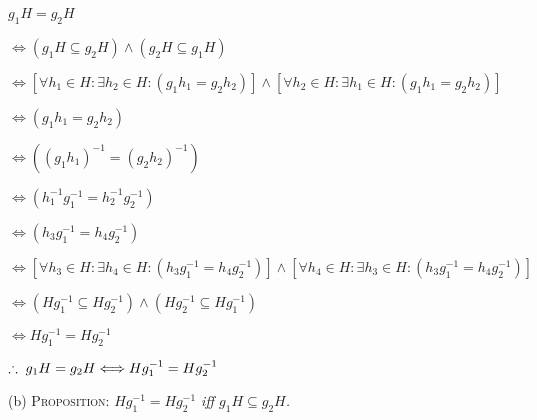 \documentclass[12pt, a4paper]{article}
\begin{document}
$g_1H=g_2H$\par
\vspace{5mm}
\hspace{8.2mm}$\Leftrightarrow(g_1H\subseteq g_2H)\wedge(g_2H\subseteq g_1H)$\par
\vspace{5mm}
\hspace{8.2mm}$\Leftrightarrow[\forall h_1\in H\colon\exists h_2\in H\colon (g_1h_1=g_2h_2)]\wedge [\forall h_2\in H\colon\exists h_1\in H\colon (g_1h_1=g_2h_2)]$\par
\vspace{5mm}
\hspace{8.2mm}$\Leftrightarrow (g_1h_1=g_2h_2)$\par
\vspace{5mm}
\hspace{8.2mm}$\Leftrightarrow ((g_1h_1)^{-1}=(g_2h_2)^{-1})$\par
\vspace{5mm}
\hspace{8.2mm}$\Leftrightarrow (h^{-1}_1g^{-1}_1=h^{-1}_2g^{-1}_2)$\par
\vspace{5mm}
\hspace{8.2mm}$\Leftrightarrow (h_3g^{-1}_1=h_4g^{-1}_2)$\par
\vspace{5mm}
\hspace{8.2mm}$\Leftrightarrow[\forall h_3\in H\colon\exists h_4\in H\colon (h_3g^{-1}_1=h_4g^{-1}_2)]\wedge [\forall h_4\in H\colon\exists h_3\in H\colon (h_3g^{-1}_1=h_4g^{-1}_2)]$\par
\vspace{5mm}
\hspace{8.2mm}$\Leftrightarrow (Hg^{-1}_1\subseteq Hg^{-1}_2)\wedge (Hg^{-1}_2\subseteq Hg^{-1}_1)$\par
\vspace{5mm}
\hspace{8.2mm}$\Leftrightarrow Hg^{-1}_1=Hg^{-1}_2$\par
\vspace{5mm}
\hspace{8.2mm}$\therefore\hspace{1mm} g_1H=g_2H\Longleftrightarrow Hg^{-1}_1=Hg^{-1}_2$\par

\vspace{12mm}

\begin{list}
\item{(b) \textsc{Proposition:} \textit{$Hg^{-1}_1=Hg^{-1}_2$ iff $g_1H\subseteq g_2H$.}}
\end{list}
\end{document}
